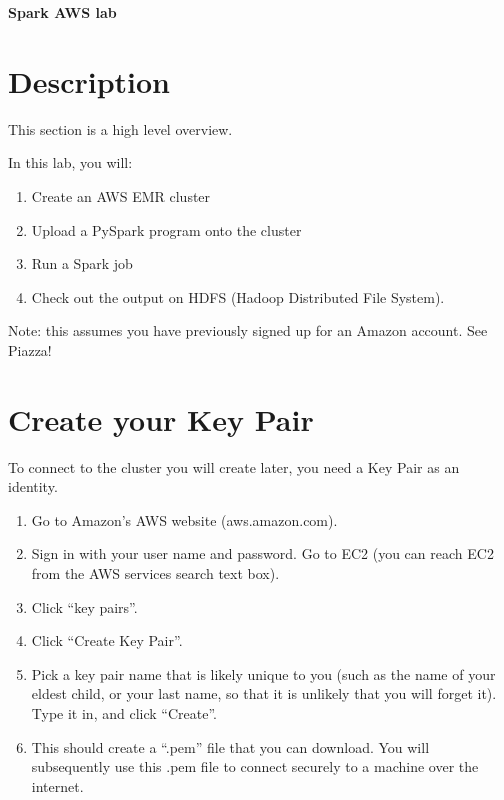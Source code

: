 \documentclass[11pt]{article}
\renewcommand\:{\colon} %
\begin{document}

\begin{center}
{\bf \huge{Spark AWS lab}}
\end{center}


\vspace{10 pt}

\section{Description}

This section is a high level overview. 

In this lab, you will:
\begin{enumerate}
\item Create an AWS EMR cluster
\item Upload a PySpark program onto the cluster
\item Run a Spark job
\item Check out the output on HDFS (Hadoop Distributed File System).
\end{enumerate}
	Note: this assumes you have previously signed up for an Amazon account. See Piazza!

\section{Create your Key Pair}
To connect to the cluster you will create later, you need a Key Pair as an identity.
\begin{enumerate}
\item Go to Amazon’s AWS website (aws.amazon.com).
\item Sign in with your user name and password. Go to EC2 (you can reach EC2 from the AWS services search text box).
\item Click ``key pairs''.
\item Click ``Create Key Pair''.
\item Pick a key pair name that is likely unique to you (such as the name of your eldest child, or your last name, so that it is unlikely that you will forget it). Type it in, and click ``Create''.
\item This should create a ``.pem'' file that you can download. You will subsequently use this .pem file to connect securely to a machine over the internet. 
\end{enumerate}
\end{document}

